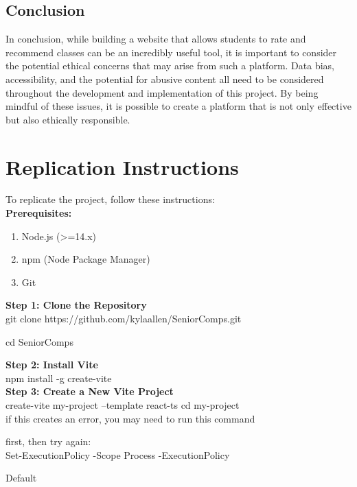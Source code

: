 \documentclass[10pt,twocolumn]{article}
\begin{document}
\subsection{Conclusion}
In conclusion, while building a website that allows students to rate and recommend classes can be an incredibly useful tool, it is important to consider the potential ethical concerns that may arise from such a platform. Data bias, accessibility, and the potential for abusive content all need to be considered throughout the development and implementation of this project. By being mindful of these issues, it is possible to create a platform that is not only effective but also ethically responsible.

\appendix
\section{Replication Instructions}

To replicate the project, follow these instructions:\\


\textbf{Prerequisites:}
\begin{enumerate}
    \item Node.js (>=14.x)
    \item npm (Node Package Manager)
    \item Git\\
\end{enumerate}

\textbf{Step 1: Clone the Repository}\\


git clone https://github.com/kylaallen/SeniorComps.git

cd SeniorComps


\textbf{Step 2: Install Vite}\\


npm install -g create-vite\\


\textbf{Step 3: Create a New Vite Project}\\

create-vite my-project --template react-ts
cd my-project\\


if this creates an error, you may need to run this command 

first, then try again:\\


Set-ExecutionPolicy -Scope Process -ExecutionPolicy 

Default\\
\end{document}
